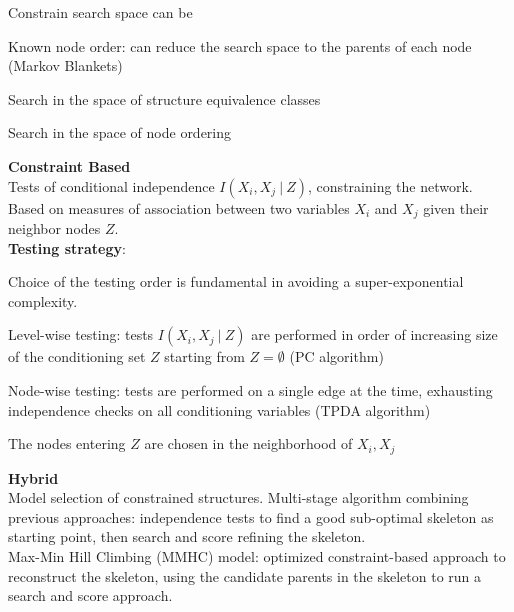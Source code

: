 \documentclass[10pt]{report}
\begin{document}
\begin{list}{}{}
	Constrain search space can be\begin{list}{}{}
		\item Known node order: can reduce the search space to the parents of each node (Markov Blankets)
		\item Search in the space of structure equivalence classes
		\item Search in the space of node ordering
	\end{list}
	\item \textbf{Constraint Based}\\
	Tests of conditional independence $I(X_i,X_j\:|\:Z)$, constraining the network. Based on measures of association between two variables $X_i$ and $X_j$ given their neighbor nodes $Z$.\\
	\textbf{Testing strategy}:\begin{list}{}{}
		\item Choice of the testing order is fundamental in avoiding a super-exponential complexity.
		\item Level-wise testing: tests $I(X_i,X_j\:|\:Z)$ are performed in order of increasing size of the conditioning set $Z$ starting from $Z = \emptyset$ (PC algorithm)
		\item Node-wise testing: tests are performed on a single edge at the time, exhausting independence checks on all conditioning variables (TPDA algorithm)
		\item The nodes entering $Z$ are chosen in the neighborhood of $X_i,X_j$
	\end{list}
	\item \textbf{Hybrid}\\
	Model selection of constrained structures. Multi-stage algorithm combining previous approaches: independence tests to find a good sub-optimal skeleton as starting point, then search and score refining the skeleton.\\
	Max-Min Hill Climbing (MMHC) model: optimized constraint-based approach to reconstruct the skeleton, using the candidate parents in the skeleton to run a search and score approach.
\end{list}
\end{document}
